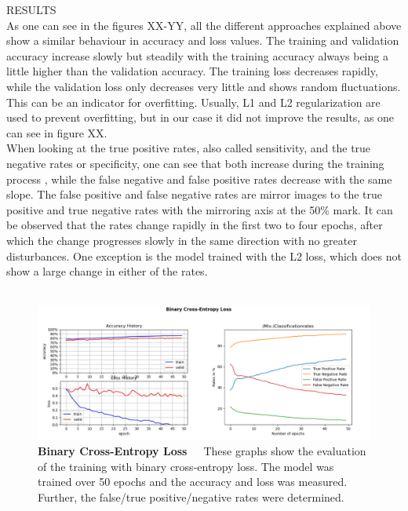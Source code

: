 RESULTS \\
As one can see in the figures XX-YY, all the different approaches explained above show a similar behaviour in accuracy and loss values. The training and validation accuracy increase slowly but steadily with the training accuracy always being a little higher than the validation accuracy. The training loss decreases rapidly, while the validation loss only decreases very little and shows random fluctuations. This can be an indicator for overfitting. Usually, L1 and L2 regularization are used to prevent overfitting, but in our case it did not improve the results, as one can see in figure XX. \\
When looking at the true positive rates, also called sensitivity, and the true negative rates or specificity, one can see that both increase during the training process , while the false negative and false positive rates decrease with the same slope. The false positive and false negative rates are mirror images to the true positive and true negative rates with the mirroring axis at the 50\% mark. It can be observed that the rates change rapidly in the first two to four epochs, after which the change progresses slowly in the same direction with no greater disturbances. One exception is the model trained with the L2 loss, which does not show a large change in either of the rates. \\
\\
\begin{figure}[h]
	\centering
	\includegraphics[scale=0.37]{Figures/chapter04/multilabel_crossentropy}
	\decoRule
	\caption[Binary Cross-Entropy Loss]{\textbf{Binary Cross-Entropy Loss}~~~These graphs show the evaluation of the training with binary cross-entropy loss. The model was trained over 50 epochs and the accuracy and loss was measured. Further, the false/true positive/negative rates were determined.}
	\label{fig:MultilabelCrossentropy}
\end{figure}
\\
